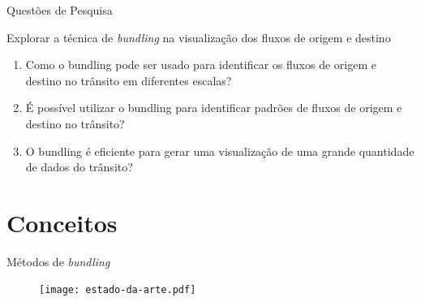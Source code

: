 \begin{frame}{Questões de Pesquisa}
  \begin{block}{Explorar a técnica de \emph{bundling} na visualização dos fluxos de origem e destino}
    \begin{enumerate}
      \pause
      \item Como o bundling pode ser usado para identificar os fluxos de origem
      e destino no trânsito em diferentes escalas?

      \pause
      \item É possível utilizar o bundling para identificar padrões de fluxos
      de origem e destino no trânsito?

      \pause
      \item O bundling é eficiente para gerar uma visualização de uma grande
      quantidade de dados do trânsito?
    \end{enumerate}
  \end{block}
\end{frame}

%
%

\section{Conceitos}

\begin{frame}{Métodos de \emph{bundling}}
  \begin{figure}[!htb]
    \centering
    \texttt{[image: estado-da-arte.pdf]}
  \end{figure}

\hfill \citep{Lhuillier2017}
\end{frame}

